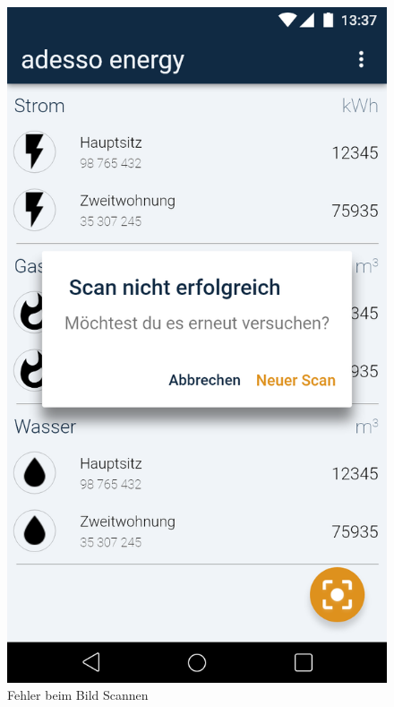 \begin{figure}[h]
	\includegraphics[scale = 0.22]{img/AndroidMockup/imageFailed}		
	\caption{Fehler beim Bild Scannen}
	\label{fig:mock-pw}
\end{figure}

